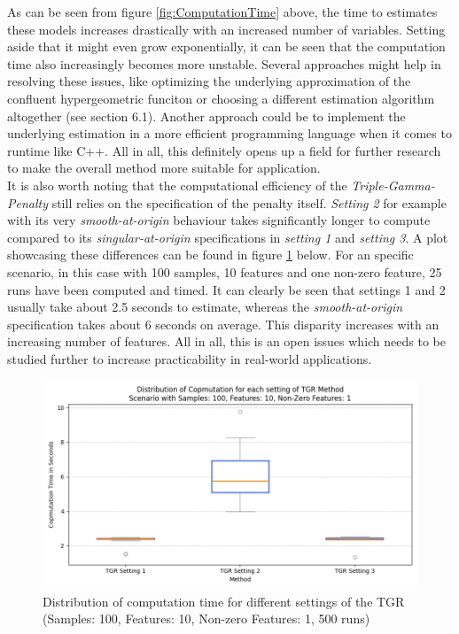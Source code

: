 \documentclass[12pt,a4paper]{article}
\begin{document}
As can be seen from figure \ref{fig:ComputationTime} above, the time to estimates these models increases drastically with an increased number of variables. Setting aside that it might even grow exponentially, it can be seen that the computation time also increasingly becomes more unstable. Several approaches might help in resolving these issues, like optimizing the underlying approximation of the confluent hypergeometric funciton or choosing a different estimation algorithm altogether (see section 6.1). Another approach could be to implement the underlying estimation in a more efficient programming language when it comes to runtime like C++. All in all, this definitely opens up a field for further research to make the overall method more suitable for application. \\


It is also worth noting that the computational efficiency of the \textit{Triple-Gamma-Penalty} still relies on the specification of the penalty itself. \textit{Setting 2} for example with its very \textit{smooth-at-origin} behaviour takes significantly longer to compute compared to its \textit{singular-at-origin} specifications in \textit{setting 1} and \textit{setting 3}. A plot showcasing these differences can be found in figure \ref{fig:ComputationTimeSettings} below. For an specific scenario, in this case with 100 samples, 10 features and one non-zero feature, 25 runs have been computed and timed. It can clearly be seen that settings 1 and 2 usually take about 2.5 seconds to estimate, whereas the \textit{smooth-at-origin} specification takes about 6 seconds on average. This disparity increases with an increasing number of features. All in all, this is an open issues which needs to be studied further to increase practicability in real-world applications. 

\begin{figure}[H]
\centering
\includegraphics[scale=0.6]{../02_simulation/021_simulation_figures/ComputationTime_Different_Settings.png}
\caption{Distribution of computation time for different settings of the TGR (Samples: 100, Features: 10, Non-zero Features: 1, 500 runs)}
\label{fig:ComputationTimeSettings}
\end{figure}
\end{document}
